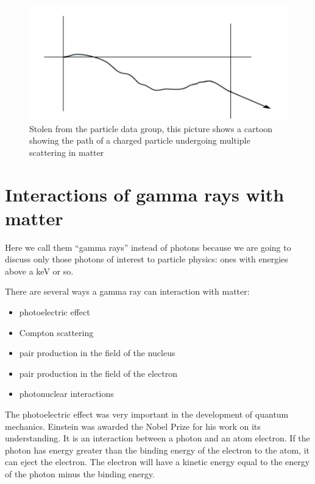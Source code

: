 \begin{figure}[h]
\centering\includegraphics[scale=0.5]{./particleinteractions/Pictures/multscattcartoon.pdf}
\caption{Stolen from the particle data group, this picture shows a cartoon showing the path of a charged particle undergoing multiple scattering in matter }
\label{fig:pdgmultscattcartoon}
\end{figure}



\section{Interactions of gamma rays with matter}

Here we call them “gamma rays” instead of photons because we are going to discuss only those photons of interest to particle physics: ones with energies above a keV or so.

There are several ways a gamma ray can interaction with matter:
\begin{itemize}
\item photoelectric effect
\item Compton scattering
\item pair production in the field of the nucleus
\item pair production in the field of the electron
\item photonuclear interactions
\end{itemize}

The photoelectric effect was very important in the development of quantum mechanics.  Einstein was awarded the Nobel Prize for his work on its understanding.  It is an interaction between a photon and an atom electron.  If the photon has energy greater than the binding energy of the electron to the atom, it can eject the electron.  The electron will have a kinetic energy equal to the energy of the photon minus the binding energy.


